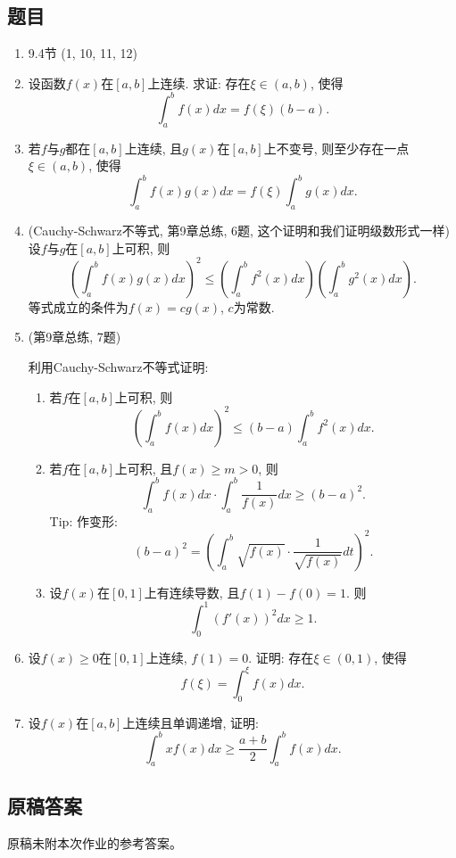 \documentclass[UTF8,11pt, a4paper, oneside, fontset=none]{ctexbook}
\begin{document}
\subsection*{题目}
\begin{enumerate}

\item 9.4节 (1, 10, 11, 12)

\item 设函数$f(x)$在$[a, b]$上连续. 求证: 存在$\xi \in (a, b)$, 使得
\[
\int_a^b f(x) dx = f(\xi) (b-a).
\]

\item 若$f$与$g$都在$[a, b]$上连续, 且$g(x)$在$[a, b]$上不变号, 则至少存在一点$\xi \in (a, b)$, 使得
\[
\int_a^b f(x)g(x) dx = f(\xi) \int_a^b g(x) dx.
\]

\item (Cauchy-Schwarz不等式, 第9章总练, 6题, 这个证明和我们证明级数形式一样)
设$f$与$g$在$[a, b]$上可积, 则
\[
\left( \int_a^b f(x)g(x) dx \right)^2 \leq \left( \int_a^b f^2(x) dx \right) \left( \int_a^b g^2(x) dx \right).
\]
等式成立的条件为$f(x)=cg(x)$, $c$为常数.

\item (第9章总练, 7题)

利用Cauchy-Schwarz不等式证明:

\begin{enumerate}
\item 若$f$在$[a, b]$上可积, 则
\[
\left( \int_a^b f(x) dx \right)^2 \leq (b-a) \int_a^b f^2(x) dx.
\]
\item 若$f$在$[a, b]$上可积, 且$f(x) \geq m >0$, 则
\[
 \int_a^b f(x) dx \cdot  \int_a^b \frac{1}{f(x)} dx \geq (b-a)^2.
\]
Tip: 作变形:
\[
(b - a)^2 = \left( \int_a^b \sqrt{f(x)} \cdot \frac{1}{\sqrt{f(x)}} dt \right)^2.
\]
\item 设$f(x)$在$[0, 1]$上有连续导数, 且$f(1) - f(0) =1$. 则 
\[
\int_0^1 (f'(x))^2 dx \geq 1.
\]
\end{enumerate}

\item 设$f(x) \geq 0$在$[0, 1]$上连续, $f(1) = 0$. 证明: 存在$\xi \in (0, 1)$, 使得
\[
f(\xi) = \int_0^{\xi} f(x) dx.
\]

\item 设$f(x)$在$[a, b]$上连续且单调递增, 证明:
\[
\int_a^b xf(x) dx \geq \frac{a+b}{2} \int_a^b f(x) dx.
\]

\end{enumerate}
\clearpage
\subsection*{原稿答案}
\noindent 原稿未附本次作业的参考答案。
\clearpage
\end{document}
